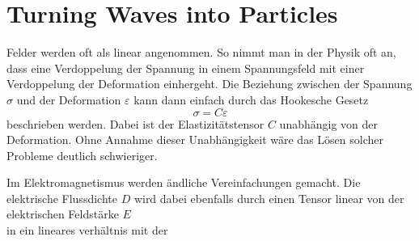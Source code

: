 %
%
%
%
\chapter{Turning Waves into Particles\label{chapter:particles}}
\begin{refsection}

Felder werden oft als linear angenommen. 
So nimmt man in der Physik oft an, dass eine Verdoppelung der Spannung in einem Spannungsfeld mit einer Verdoppelung der Deformation einhergeht.
Die Beziehung zwischen der Spannung $\sigma$ und der Deformation $\varepsilon$ kann dann einfach durch das Hookesche Gesetz
\[
    \sigma = C \varepsilon
\]
beschrieben werden. %
Dabei ist der Elastizitätstensor $C$ unabhängig von der Deformation.
Ohne Annahme dieser Unabhängigkeit wäre das Lösen solcher Probleme deutlich schwieriger.

Im Elektromagnetismus werden ändliche Vereinfachungen gemacht. 
Die elektrische Flussdichte $D$ wird dabei ebenfalls durch einen Tensor linear von der elektrischen Feldstärke $E$
\[

\]
in ein lineares verhältnis mit der 


\printbibliography[heading=subbibliography]
\end{refsection}

